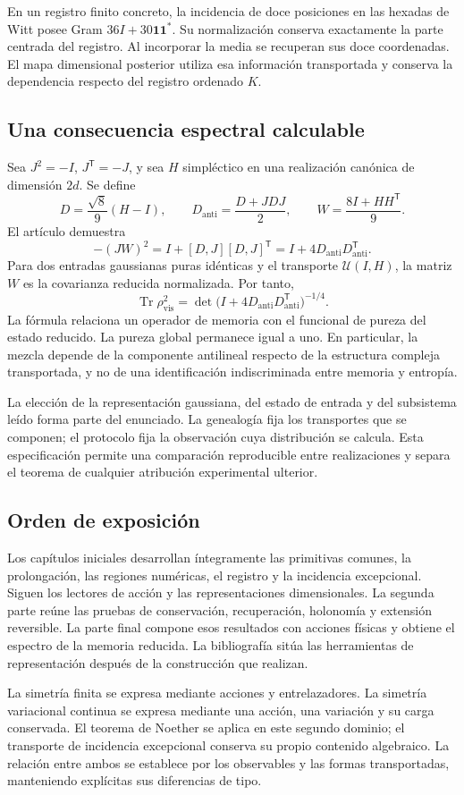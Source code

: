 En un registro finito concreto, la incidencia de doce posiciones en las hexadas de Witt posee Gram
\(36I+30\mathbf1\mathbf1^*\). Su normalización conserva exactamente la parte centrada del registro. Al incorporar la media se recuperan sus doce coordenadas. El mapa dimensional posterior utiliza esa información transportada y conserva la dependencia respecto del registro ordenado \(K\).

\subsection{Una consecuencia espectral calculable}
Sea \(J^2=-I\), \(J^{\mathsf T}=-J\), y sea \(H\) simpléctico en una realización canónica de dimensión \(2d\). Se define
\[
D=\frac{\sqrt8}{9}(H-I),\qquad
D_{\mathrm{anti}}=\frac{D+JDJ}{2},\qquad
W=\frac{8I+HH^{\mathsf T}}9.
\]
El artículo demuestra
\begin{equation}
\boxed{-(JW)^2=I+[D,J][D,J]^{\mathsf T}
=I+4D_{\mathrm{anti}}D_{\mathrm{anti}}^{\mathsf T}.}
\label{nuclear:eq:espectro}
\end{equation}
Para dos entradas gaussianas puras idénticas y el transporte \(\mathcal U(I,H)\), la matriz \(W\) es la covarianza reducida normalizada. Por tanto,
\[
\operatorname{Tr}\rho_{\mathrm{vis}}^2
=\det\bigl(I+4D_{\mathrm{anti}}D_{\mathrm{anti}}^{\mathsf T}\bigr)^{-1/4}.
\]
La fórmula relaciona un operador de memoria con el funcional de pureza del estado reducido. La pureza global permanece igual a uno. En particular, la mezcla depende de la componente antilineal respecto de la estructura compleja transportada, y no de una identificación indiscriminada entre memoria y entropía.

La elección de la representación gaussiana, del estado de entrada y del subsistema leído forma parte del enunciado. La genealogía fija los transportes que se componen; el protocolo fija la observación cuya distribución se calcula. Esta especificación permite una comparación reproducible entre realizaciones y separa el teorema de cualquier atribución experimental ulterior.

\subsection{Orden de exposición}
Los capítulos iniciales desarrollan íntegramente las primitivas comunes, la prolongación, las regiones numéricas, el registro y la incidencia excepcional. Siguen los lectores de acción y las representaciones dimensionales. La segunda parte reúne las pruebas de conservación, recuperación, holonomía y extensión reversible. La parte final compone esos resultados con acciones físicas y obtiene el espectro de la memoria reducida. La bibliografía sitúa las herramientas de representación después de la construcción que realizan.

La simetría finita se expresa mediante acciones y entrelazadores. La simetría variacional continua se expresa mediante una acción, una variación y su carga conservada. El teorema de Noether se aplica en este segundo dominio; el transporte de incidencia excepcional conserva su propio contenido algebraico. La relación entre ambos se establece por los observables y las formas transportadas, manteniendo explícitas sus diferencias de tipo.
